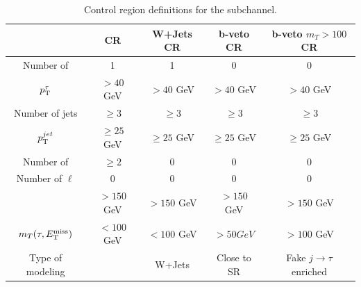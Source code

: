 		\begin{table}[!thp]
			\begin{tabular}{| c | c | c | c | c |} \hline
														& \ttbar CR 		& W+Jets CR 		& b-veto CR 		& b-veto $m_{T} > 100$ CR 						 	\\ \hline
				Number of \tauhad 	& 1 						& 1 						& 0 						& 0 																		\\ \hline
				$p_{\text{T}}^{\tau}$ 				& $ > 40$ GeV 	& $ > 40$ GeV 	& $ > 40$ GeV 	& $ > 40$ GeV 													\\ \hline
				Number of jets 			& $\geq 3$ 			& $\geq 3$ 			& $\geq 3$ 			& $\geq 3$ 															\\ \hline
				$p_{\text{T}}^{jet}$ 				& $\geq 25$ GeV & $\geq 25$ GeV & $\geq 25$ GeV & $\geq 25$ GeV 												\\ \hline
				Number of \bjets		& $\geq 2$ 			& 0 						& 0 						& 0 																		\\ \hline
				Number of $\ell$ 		& 0 						& 0 						& 0 						& 0 																		\\ \hline
				\Etm 								& $> 150$ GeV 	& $> 150$ GeV 	& $> 150$ GeV 	& $> 150$ GeV 													\\ \hline
				$m_{T}(\tau, E_\text{T}^\text{miss})$	& $< 100$ GeV 	& $< 100$ GeV 	& $> 50 GeV$ 		& $> 100$ GeV 													\\ \hline
				Type of modeling 		& \ttbar 				& W+Jets 				& Close to SR 	& Fake $j \to \tau$ enriched 						\\ \hline
			\end{tabular}
			\caption{Control region definitions for the \taujets subchannel.}
			\label{tab:taujet-control-regions}
		\end{table}


